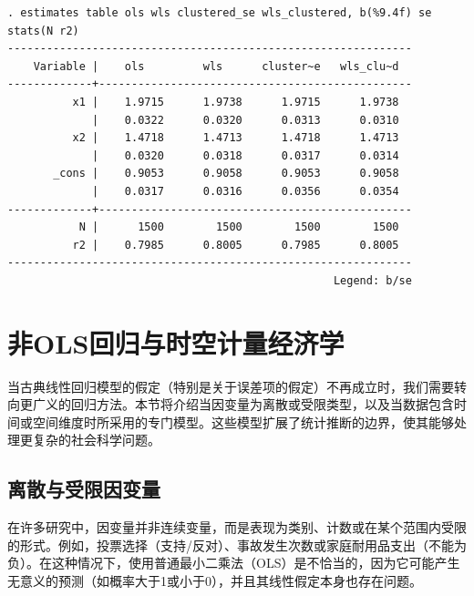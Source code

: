\begin{tcolorbox}[title=在 Stata 中实现加权-聚类稳健标准误, colback=white, colframe=black, colbacktitle=white, coltitle=black,fonttitle=\bfseries]

	\begin{Verbatim}[commandchars=\\\{\},xleftmargin=2em]
. estimates table ols wls clustered_se wls_clustered, b(%9.4f) se stats(N r2)
--------------------------------------------------------------
    Variable |    ols         wls      cluster~e   wls_clu~d  
-------------+------------------------------------------------
          x1 |    1.9715      1.9738      1.9715      1.9738  
             |    0.0322      0.0320      0.0313      0.0310  
          x2 |    1.4718      1.4713      1.4718      1.4713  
             |    0.0320      0.0318      0.0317      0.0314  
       _cons |    0.9053      0.9058      0.9053      0.9058  
             |    0.0317      0.0316      0.0356      0.0354  
-------------+------------------------------------------------
           N |      1500        1500        1500        1500  
          r2 |    0.7985      0.8005      0.7985      0.8005  
--------------------------------------------------------------
                                                  Legend: b/se

	\end{Verbatim}

\end{tcolorbox}

\section{非OLS回归与时空计量经济学}

当古典线性回归模型的假定（特别是关于误差项的假定）不再成立时，我们需要转向更广义的回归方法。本节将介绍当因变量为离散或受限类型，以及当数据包含时间或空间维度时所采用的专门模型。这些模型扩展了统计推断的边界，使其能够处理更复杂的社会科学问题。

\subsection{离散与受限因变量}

在许多研究中，因变量并非连续变量，而是表现为类别、计数或在某个范围内受限的形式。例如，投票选择（支持/反对）、事故发生次数或家庭耐用品支出（不能为负）。在这种情况下，使用普通最小二乘法（OLS）是不恰当的，因为它可能产生无意义的预测（如概率大于1或小于0），并且其线性假定本身也存在问题。

